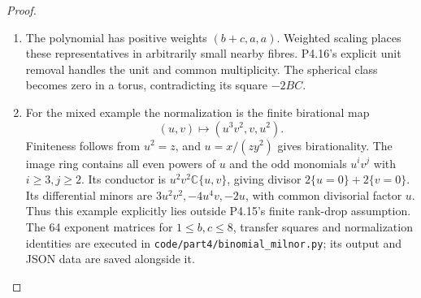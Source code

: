 \begin{proof}
\begin{enumerate}[label={$\langle1\rangle$\arabic*.},leftmargin=*]
\item The polynomial has positive weights $(b+c,a,a)$. Weighted
scaling places these representatives in arbitrarily small
nearby fibres. P4.16's explicit unit removal handles the unit
and common multiplicity. The spherical class becomes zero
in a torus, contradicting its square $-2BC$.

\item For the mixed example the normalization is the finite
birational map
\[
 (u,v)\longmapsto(u^3v^2,v,u^2).
\]
Finiteness follows from $u^2=z$, and $u=x/(zy^2)$ gives
birationality. The image ring contains all even powers of $u$
and the odd monomials $u^iv^j$ with $i\geq3,j\geq2$.
Its conductor is $u^2v^2\mathbb C\{u,v\}$, giving divisor
$2\{u=0\}+2\{v=0\}$. Its differential minors are
$3u^2v^2,-4u^4v,-2u$, with common divisorial factor $u$.
Thus this example explicitly lies outside P4.15's finite
rank-drop assumption. The 64 exponent matrices for
$1\leq b,c\leq8$, transfer squares and normalization
identities are executed in
\texttt{code/part4/binomial\_milnor.py}; its output and
JSON data are saved alongside it.

\end{enumerate}
\end{proof}
